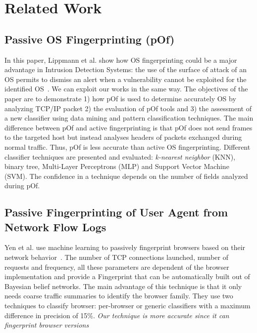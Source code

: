 \documentclass[10pt]{IEEEtran}
\begin{document}
\section{Related Work}
\label{sec:related}

\subsection{Passive OS Fingerprinting (pOf)}
\label{subsec:pof}
In this paper, Lippmann et al. show how OS fingerprinting could be a major advantage in 
Intrusion Detection Systems: the use of the surface of attack of an OS permits to dismiss 
an alert when a vulnerability cannot be exploited for the identified 
OS~\cite{lippmann2003passive}. We can exploit our works in the same way. The objectives of the 
paper are to demonstrate 
1) how pOf is used to determine accurately OS by analyzing TCP/IP packet 
2) the evaluation of pOf tools and
3) the assessment of a new classifier using data mining and pattern classification techniques.
The main difference between pOf and active fingerprinting is that pOf does not send frames to 
the targeted host but instead analyses headers of packets exchanged during normal traffic. 
Thus, pOf is less accurate than active OS fingerprinting. Different classifier techniques are 
presented and evaluated: \textit{k-nearest neighbor} (KNN), 
binary tree, Multi-Layer Perceptrons (MLP) and Support Vector Machine (SVM). 
The confidence in a technique depends on the number of fields analyzed during pOf.

\subsection{Passive Fingerprinting of User Agent from Network Flow Logs}
\label{subsec:passive-fp-network-flow}
    
Yen et al. use machine learning to passively fingerprint browsers based on their network 
behavior~\cite{yen2009browser}. The number of TCP connections launched, number of requests 
and frequency, all these parameters are dependent of the browser implementation and provide a 
Fingerprint that can be automatically built out of Bayesian belief networks. The main advantage 
of this technique is that it only needs coarse traffic summaries to identify the browser family.  
They use two techniques to classify browser: per-browser or generic classifiers with a maximum 
difference in precision of 15\%.
\textit{Our technique is more accurate since it can fingerprint browser versions}
    
\end{document}
